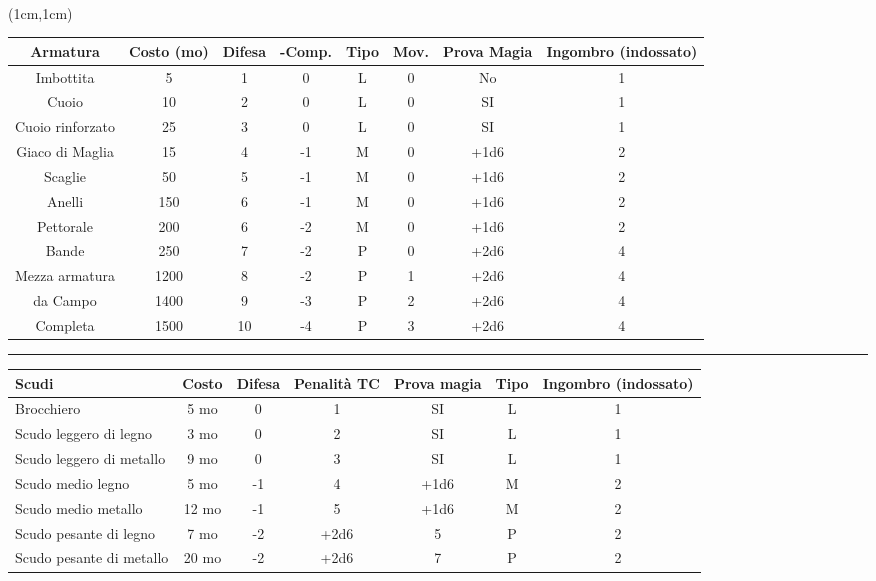 \documentclass[a4paper,12 pt,openany]{book}
\newcommand{\riga}{\rule{\textwidth}{0.4pt}}
\begin{document}
~\newpage

\begin{textblock*}{18cm}(1cm,1cm) %

\begin{tabular}{cccccccc}
\textbf{Armatura} & \textbf{Costo (mo)} & \textbf{Difesa} & \textbf{-Comp.} &  \textbf{Tipo} & \textbf{Mov.} & \textbf{Prova Magia}&\textbf{Ingombro (indossato)}\\
\hline
Imbottita   & 5    & 1   & 0  &  L   & 0   & No&1\\
Cuoio   & 10   & 2   & 0   & L   & 0   & SI&1\\
Cuoio rinforzato   & 25  &3  & 0   &    L   & 0 &SI&1 \\
Giaco di Maglia   & 15   & 4  & -1  &  M   & 0  &+1d6&2\\
Scaglie& 50   & 5  & -1  &  M   & 0 &+1d6 &2\\
Anelli & 150  & 6  & -1  &  M   & 0  &+1d6&2\\
Pettorale    & 200  & 6  & -2  &  M  &  0 &+1d6 &2\\
Bande   & 250  & 7  & -2  &  P   & 0  &+2d6 &4\\
Mezza armatura   & 1200 & 8  & -2  &  P   & 1 &+2d6&4  \\
da Campo& 1400 & 9 & -3  &   P   & 2  &+2d6&4 \\
Completa& 1500 & 10  & -4  & P   & 3  &+2d6&4 \\
\end{tabular}

\riga

\begin{tabular}{lcccccc}
\textbf{Scudi} & \textbf{Costo} & \textbf{Difesa} & \textbf{Penalità TC} & \textbf{Prova magia} & \textbf{Tipo} & \textbf{Ingombro (indossato)}\\
\hline
Brocchiero& 5 mo  &  0& 1& SI& L&1\\
Scudo leggero di legno   & 3 mo  &  0& 2& SI  & L&1\\
Scudo leggero di metallo & 9  mo  &  0& 3&SI  & L&1\\
Scudo medio legno   & 5 mo   &  -1& 4& +1d6  & M&2\\
Scudo medio metallo & 12 mo  & -1  & 5& +1d6  & M&2\\
Scudo pesante di legno   & 7  mo  &  -2    & +2d6&5  & P&2\\
Scudo pesante di metallo & 20 mo  &  -2    & +2d6&7  & P&2\\
\end{tabular}


\end{textblock*}
\end{document}
